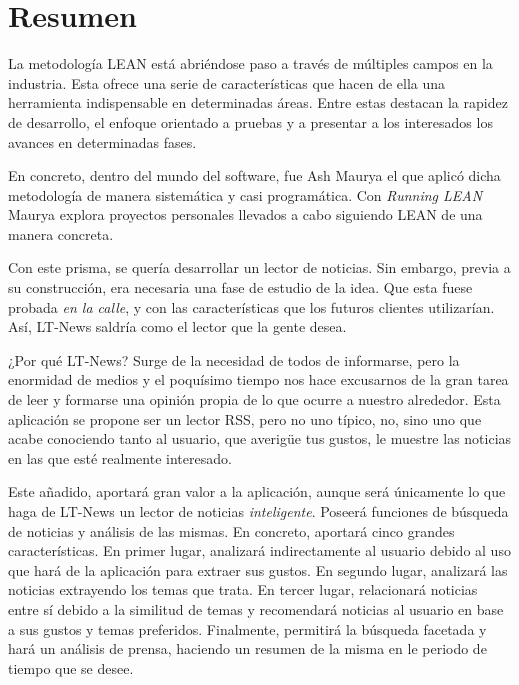\chapter{Resumen}

La metodología LEAN está abriéndose paso a través de múltiples campos en la industria. Esta ofrece una serie de características que hacen de ella una herramienta indispensable en determinadas áreas. Entre estas destacan la rapidez de desarrollo, el enfoque orientado a pruebas y a presentar a los interesados los avances en determinadas fases.

En concreto, dentro del mundo del software, fue Ash Maurya el que aplicó dicha metodología de manera sistemática y casi programática. Con \textit{Running LEAN} Maurya explora proyectos personales llevados a cabo siguiendo LEAN de una manera concreta.

Con este prisma, se quería desarrollar un lector de noticias. Sin embargo, previa a su construcción, era necesaria una fase de estudio de la idea. Que esta fuese probada \textit{en la calle}, y con las características que los futuros clientes utilizarían. Así, LT-News saldría como el lector que la gente desea.

¿Por qué LT-News? Surge de la necesidad de todos de informarse, pero la enormidad de medios y el poquísimo tiempo nos hace excusarnos de la gran tarea de leer y formarse una opinión propia de lo que ocurre a nuestro alrededor. Esta aplicación se propone ser un lector RSS, pero no uno típico, no, sino uno que acabe conociendo tanto al usuario, que averigüe tus gustos, le muestre las noticias en las que esté realmente interesado.

Este añadido, aportará gran valor a la aplicación, aunque será únicamente lo que haga de LT-News un lector de noticias \textit{inteligente}. Poseerá funciones de búsqueda de noticias y análisis de las mismas. En concreto, aportará cinco grandes características. En primer lugar, analizará indirectamente al usuario debido al uso que hará de la aplicación para extraer sus gustos. En segundo lugar, analizará las noticias extrayendo los temas que trata. En tercer lugar, relacionará noticias entre sí debido a la similitud de temas y recomendará noticias al usuario en base a sus gustos y temas preferidos. Finalmente, permitirá la búsqueda facetada y hará un análisis de prensa, haciendo un resumen de la misma en le periodo de tiempo que se desee. 